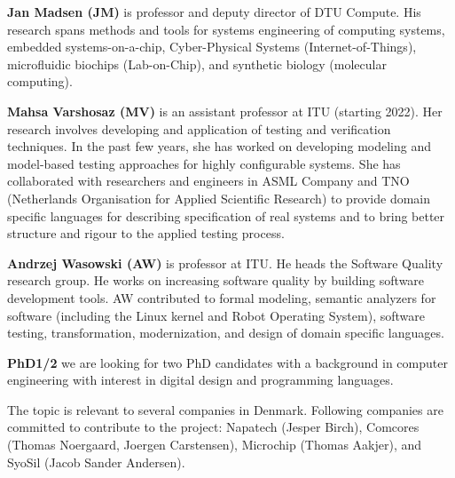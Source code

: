 \documentclass[fleqn,12pt]{article}
\begin{document}
{\bf Jan Madsen (JM)} is professor and deputy director of DTU Compute.
His research spans methods
and tools for systems engineering of computing systems, embedded systems-on-a-chip,
Cyber-Physical Systems (Internet-of-Things), microfluidic biochips (Lab-on-Chip), and
synthetic biology (molecular computing).


{\bf Mahsa Varshosaz (MV)} is an assistant professor at ITU (starting 2022). Her research involves developing and application of testing and verification techniques. In the past few years, she has worked on developing modeling and model-based testing approaches for highly configurable systems. She has collaborated with researchers and engineers in ASML Company and TNO (Netherlands Organisation for Applied Scientific Research) to provide domain specific languages for describing specification of real systems and to bring better structure and rigour to the applied testing process.

{\bf Andrzej Wasowski (AW)} is professor at ITU. He heads the Software Quality research group.  He works on increasing software quality by building software development tools. AW contributed to formal modeling, semantic analyzers for software (including the Linux kernel and Robot Operating System), software testing, transformation, modernization, and design of domain specific languages.


{\bf PhD1/2} we are looking for two PhD candidates with a background in computer engineering
with interest in digital design and programming languages.

The topic is relevant to several companies in Denmark. Following companies are committed to contribute to the project: Napatech (Jesper Birch), Comcores (Thomas Noergaard, Joergen Carstensen), Microchip (Thomas Aakjer), and SyoSil (Jacob Sander Andersen).
\end{document}
